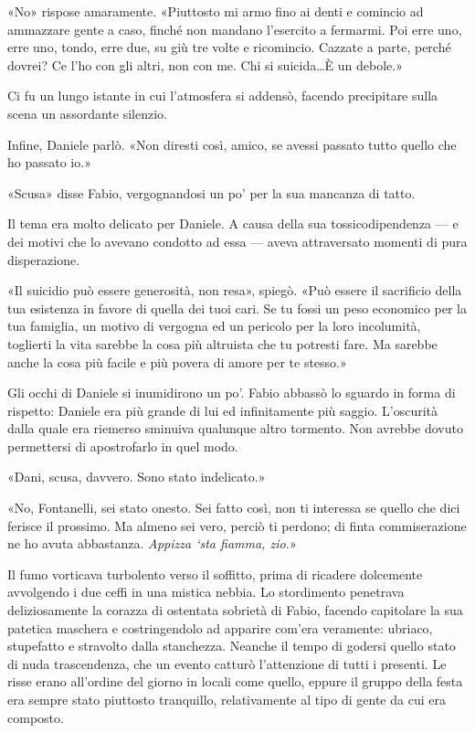 «No» rispose amaramente. «Piuttosto mi armo fino ai denti e comincio ad ammazzare gente a caso, finché non mandano l'esercito a fermarmi. Poi erre uno, erre uno, tondo, erre due, su giù tre volte e ricomincio. Cazzate a parte, perché dovrei? Ce l'ho con gli altri, non con me. Chi si suicida\ldots È un debole.»

Ci fu un lungo istante in cui l'atmosfera si addensò, facendo precipitare sulla scena un assordante silenzio.

Infine, Daniele parlò. «Non diresti così, amico, se avessi passato tutto quello che ho passato io.»

«Scusa» disse Fabio, vergognandosi un po' per la sua mancanza di tatto.

Il tema era molto delicato per Daniele. A causa della sua tossicodipendenza --- e dei motivi che lo avevano condotto ad essa --- aveva attraversato momenti di pura disperazione.

«Il suicidio può essere generosità, non resa», spiegò. «Può essere il sacrificio della tua esistenza in favore di quella dei tuoi cari. Se tu fossi un peso economico per la tua famiglia, un motivo di vergogna ed un pericolo per la loro incolumità, toglierti la vita sarebbe la cosa più altruista che tu potresti fare. Ma sarebbe anche la cosa più facile e più povera di amore per te stesso.»

Gli occhi di Daniele si inumidirono un po'. Fabio abbassò lo sguardo in forma di rispetto: Daniele era più grande di lui ed infinitamente più saggio. L'oscurità dalla quale era riemerso sminuiva qualunque altro tormento. Non avrebbe dovuto permettersi di apostrofarlo in quel modo.

«Dani, scusa, davvero. Sono stato indelicato.»

«No, Fontanelli, sei stato onesto. Sei fatto così, non ti interessa se quello che dici ferisce il prossimo. Ma almeno sei vero, perciò ti perdono; di finta commiserazione ne ho avuta abbastanza. \emph{Appizza `sta fiamma, zio.}»

Il fumo vorticava turbolento verso il soffitto, prima di ricadere dolcemente avvolgendo i due ceffi in una mistica nebbia. Lo stordimento penetrava deliziosamente la corazza di ostentata sobrietà di Fabio, facendo capitolare la sua patetica maschera e costringendolo ad apparire com'era veramente: ubriaco, stupefatto e stravolto dalla stanchezza. Neanche il tempo di godersi quello stato di nuda trascendenza, che un evento catturò l'attenzione di tutti i presenti. Le risse erano all'ordine del giorno in locali come quello, eppure il gruppo della festa era sempre stato piuttosto tranquillo, relativamente al tipo di gente da cui era composto.


